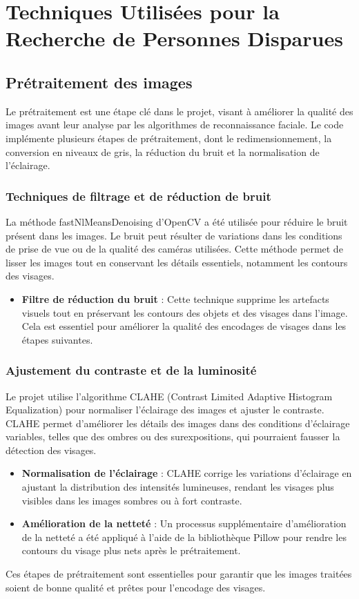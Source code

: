 \documentclass[a4paper,12pt]{report}
\begin{document}
\chapter{Techniques Utilisées pour la Recherche de Personnes Disparues}

\section{Prétraitement des images}
Le prétraitement est une étape clé dans le projet, visant à améliorer la qualité des images avant leur analyse par les algorithmes de reconnaissance faciale. Le code implémente plusieurs étapes de prétraitement, dont le redimensionnement, la conversion en niveaux de gris, la réduction du bruit et la normalisation de l'éclairage.

\subsection{Techniques de filtrage et de réduction de bruit}
La méthode fastNlMeansDenoising d’OpenCV a été utilisée pour réduire le bruit présent dans les images. Le bruit peut résulter de variations dans les conditions de prise de vue ou de la qualité des caméras utilisées. Cette méthode permet de lisser les images tout en conservant les détails essentiels, notamment les contours des visages.

\begin{itemize}
    \item \textbf{Filtre de réduction du bruit} : Cette technique supprime les artefacts visuels tout en préservant les contours des objets et des visages dans l'image. Cela est essentiel pour améliorer la qualité des encodages de visages dans les étapes suivantes.
\end{itemize}

\subsection{Ajustement du contraste et de la luminosité}
Le projet utilise l'algorithme CLAHE (Contrast Limited Adaptive Histogram Equalization) pour normaliser l'éclairage des images et ajuster le contraste. CLAHE permet d'améliorer les détails des images dans des conditions d'éclairage variables, telles que des ombres ou des surexpositions, qui pourraient fausser la détection des visages.
\begin{itemize}
    \item \textbf{Normalisation de l'éclairage} : CLAHE corrige les variations d'éclairage en ajustant la distribution des intensités lumineuses, rendant les visages plus visibles dans les images sombres ou à fort contraste.
    \item \textbf{Amélioration de la netteté} : Un processus supplémentaire d'amélioration de la netteté a été appliqué à l'aide de la bibliothèque Pillow pour rendre les contours du visage plus nets après le prétraitement.
\end{itemize}
Ces étapes de prétraitement sont essentielles pour garantir que les images traitées soient de bonne qualité et prêtes pour l'encodage des visages.
\end{document}
